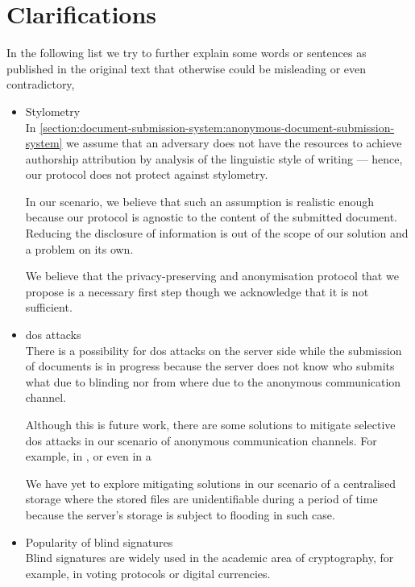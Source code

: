 

\section{Clarifications}
    \label{section:thesis:appendix:dss:clarifications}
In the following list we try to further explain some words or sentences as published 
in the original text that otherwise could be misleading or even contradictory,
\begin{itemize}
    \item Stylometry\\
    In \cref{section:document-submission-system:anonymous-document-submission-system} 
    we assume that an adversary does not have the resources to achieve authorship 
    attribution by analysis of the linguistic style of writing --- hence, our protocol 
    does not protect against stylometry.
    
    In our scenario, we believe that such an assumption is realistic enough because 
    our protocol is agnostic to the content of the submitted document. Reducing 
    the disclosure of information is out of the scope of our solution and a problem 
    on its own.
    
    We believe that the privacy-preserving and anonymisation protocol that we propose 
    is a necessary first step though we acknowledge that it is not sufficient.
    
    \item \Ac{dos} attacks\\
    There is a possibility for \ac{dos} attacks on the server side while the submission 
    of documents is in progress because the server does not know who submits what 
    due to blinding nor from where due to the anonymous communication channel.
    
    Although this is future work, there are some solutions to mitigate selective 
    \ac{dos} attacks in our scenario of anonymous communication channels. For example, 
    in \cite{DasB13}, or even in \cite{JansenTJS14} a 
    
    We have yet to explore mitigating solutions in our scenario of a centralised 
    storage where the stored files are unidentifiable during a period of time because 
    the server's storage is subject to flooding in such case.
    
    \item Popularity of blind signatures\\
    Blind signatures are widely used in the academic area of cryptography, for example, 
    in voting protocols or digital currencies. 
\end{itemize}

